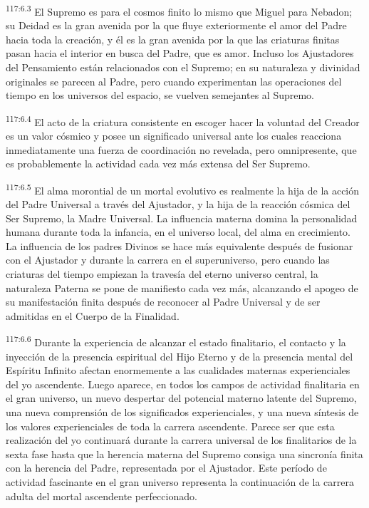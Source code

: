 \documentclass[twoside, 11pt]{book}
\begin{document}
\par
\textsuperscript{117:6.3} El Supremo es para el cosmos finito lo mismo que Miguel para Nebadon; su Deidad es la gran avenida por la que fluye exteriormente el amor del Padre hacia toda la creación, y él es la gran avenida por la que las criaturas finitas pasan hacia el interior en busca del Padre, que es amor. Incluso los Ajustadores del Pensamiento están relacionados con el Supremo; en su naturaleza y divinidad originales se parecen al Padre, pero cuando experimentan las operaciones del tiempo en los universos del espacio, se vuelven semejantes al Supremo.

\par
\textsuperscript{117:6.4} El acto de la criatura consistente en escoger hacer la voluntad del Creador es un valor cósmico y posee un significado universal ante los cuales reacciona inmediatamente una fuerza de coordinación no revelada, pero omnipresente, que es probablemente la actividad cada vez más extensa del Ser Supremo.

\par
\textsuperscript{117:6.5} El alma morontial de un mortal evolutivo es realmente la hija de la acción del Padre Universal a través del Ajustador, y la hija de la reacción cósmica del Ser Supremo, la Madre Universal. La influencia materna domina la personalidad humana durante toda la infancia, en el universo local, del alma en crecimiento. La influencia de los padres Divinos se hace más equivalente después de fusionar con el Ajustador y durante la carrera en el superuniverso, pero cuando las criaturas del tiempo empiezan la travesía del eterno universo central, la naturaleza Paterna se pone de manifiesto cada vez más, alcanzando el apogeo de su manifestación finita después de reconocer al Padre Universal y de ser admitidas en el Cuerpo de la Finalidad.

\par
\textsuperscript{117:6.6} Durante la experiencia de alcanzar el estado finalitario, el contacto y la inyección de la presencia espiritual del Hijo Eterno y de la presencia mental del Espíritu Infinito afectan enormemente a las cualidades maternas experienciales del yo ascendente. Luego aparece, en todos los campos de actividad finalitaria en el gran universo, un nuevo despertar del potencial materno latente del Supremo, una nueva comprensión de los significados experienciales, y una nueva síntesis de los valores experienciales de toda la carrera ascendente. Parece ser que esta realización del yo continuará durante la carrera universal de los finalitarios de la sexta fase hasta que la herencia materna del Supremo consiga una sincronía finita con la herencia del Padre, representada por el Ajustador. Este período de actividad fascinante en el gran universo representa la continuación de la carrera adulta del mortal ascendente perfeccionado.
\end{document}
